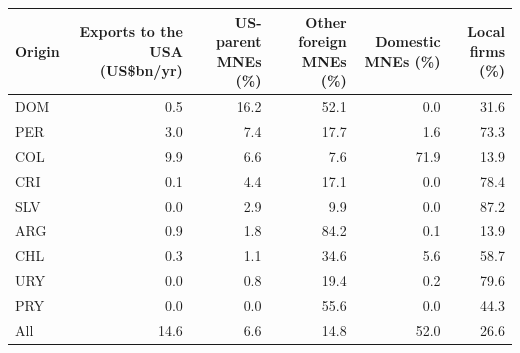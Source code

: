 \begin{tabular}{lrrrrr}
\toprule
Origin & Exports to the USA (US\$bn/yr) & US-parent MNEs (\%) & Other foreign MNEs (\%) & Domestic MNEs (\%) & Local firms (\%) \\
\midrule
DOM & 0.5 & 16.2 & 52.1 & 0.0 & 31.6 \\
PER & 3.0 & 7.4 & 17.7 & 1.6 & 73.3 \\
COL & 9.9 & 6.6 & 7.6 & 71.9 & 13.9 \\
CRI & 0.1 & 4.4 & 17.1 & 0.0 & 78.4 \\
SLV & 0.0 & 2.9 & 9.9 & 0.0 & 87.2 \\
ARG & 0.9 & 1.8 & 84.2 & 0.1 & 13.9 \\
CHL & 0.3 & 1.1 & 34.6 & 5.6 & 58.7 \\
URY & 0.0 & 0.8 & 19.4 & 0.2 & 79.6 \\
PRY & 0.0 & 0.0 & 55.6 & 0.0 & 44.3 \\
\midrule
All & 14.6 & 6.6 & 14.8 & 52.0 & 26.6 \\
\bottomrule
\end{tabular}
